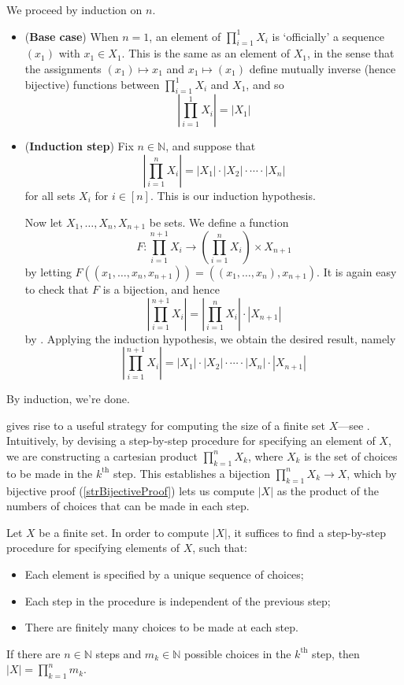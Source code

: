\begin{cproof}
We proceed by induction on $n$.
\begin{itemize}
\item (\textbf{Base case}) When $n=1$, an element of $\prod_{i=1}^1 X_i$ is `officially' a sequence $(x_1)$ with $x_1 \in X_1$. This is the same as an element of $X_1$, in the sense that the assignments $(x_1) \mapsto x_1$ and $x_1 \mapsto (x_1)$ define mutually inverse (hence bijective) functions between $\prod_{i=1}^1 X_i$ and $X_1$, and so
\[ \left| \prod_{i=1}^1 X_i \right| = |X_1| \]
\item (\textbf{Induction step}) Fix $n \in \mathbb{N}$, and suppose that
\[ \displaystyle \left| \prod_{i=1}^n X_i \right| = |X_1| \cdot |X_2| \cdot \cdots \cdot |X_n| \]
for all sets $X_i$ for $i \in [n]$. This is our induction hypothesis.

Now let $X_1, \dots, X_n, X_{n+1}$ be sets. We define a function
\[ F : \prod_{i=1}^{n+1} X_i \to \left(\prod_{i=1}^n X_i\right) \times X_{n+1} \]
by letting $F((x_1, \dots, x_n, x_{n+1})) = ((x_1, \dots, x_n), x_{n+1})$. It is again easy to check that $F$ is a bijection, and hence
\[ \left| \prod_{i=1}^{n+1} X_i \right| = \left| \prod_{i=1}^n X_i \right| \cdot |X_{n+1}| \]
by . Applying the induction hypothesis, we obtain the desired result, namely
\[ \left| \prod_{i=1}^{n+1} X_i \right| = |X_1| \cdot |X_2| \cdot \cdots \cdot |X_n| \cdot |X_{n+1}| \]
\end{itemize}
By induction, we're done.
\end{cproof}

 gives rise to a useful strategy for computing the size of a finite set $X$---see . Intuitively, by devising a step-by-step procedure for specifying an element of $X$, we are constructing a cartesian product $\prod_{k=1}^n X_k$, where $X_k$ is the set of choices to be made in the $k^{\text{th}}$ step. This establishes a bijection $\prod_{k=1}^n X_k \to X$, which by bijective proof (\ref{strBijectiveProof}) lets us compute $|X|$ as the product of the numbers of choices that can be made in each step.

\begin{strategy}
\label{strMultiplicationPrincipleIndependent}
Let $X$ be a finite set. In order to compute $|X|$, it suffices to find a step-by-step procedure for specifying elements of $X$, such that:
\vspace{5pt}
\begin{itemize}
\item Each element is specified by a unique sequence of choices;
\item Each step in the procedure is independent of the previous step;
\item There are finitely many choices to be made at each step.
\end{itemize}
\vspace{5pt}
If there are $n \in \mathbb{N}$ steps and $m_k \in \mathbb{N}$ possible choices in the $k^{\text{th}}$ step, then $|X| = \prod_{k=1}^n m_k$.
\end{strategy}

